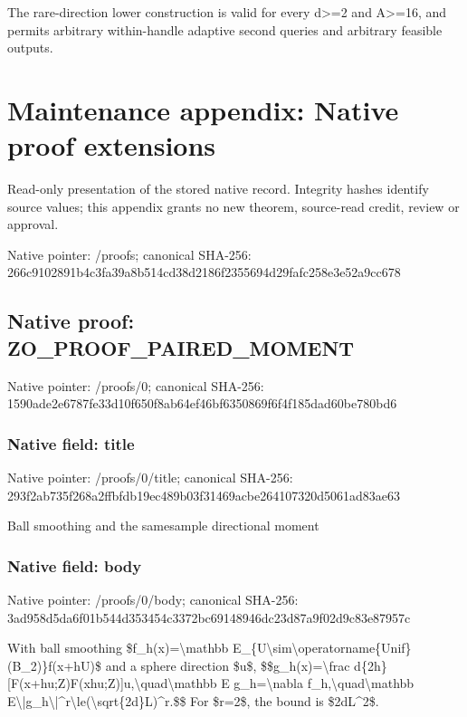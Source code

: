 \documentclass[10pt,a4paper]{article}
\begin{document}
The rare-direction lower construction is valid for every d>=2 and A>=16, and permits arbitrary within-handle adaptive second queries and arbitrary feasible outputs.



\section{Maintenance appendix: Native proof extensions}


Read-only presentation of the stored native record. Integrity hashes identify source values; this appendix grants no new theorem, source-read credit, review or approval.



Native pointer: /proofs; canonical SHA-256: 266c9102891b4c3fa39a8b51\allowbreak{}4cd38d2186f2355694d29faf\allowbreak{}c258e3e52a9cc678



\subsection{Native proof: ZO\_PROOF\_PAIRED\_MOMENT}


Native pointer: /proofs/0; canonical SHA-256: 1590ade2e6787fe33d10f650\allowbreak{}f8ab64ef46bf6350869f6f4f\allowbreak{}185dad60be780bd6



\subsubsection{Native field: title}


Native pointer: /proofs/0/title; canonical SHA-256: 293f2ab735f268a2ffbfdb19\allowbreak{}ec489b03f31469acbe264107\allowbreak{}320d5061ad83ae63


Ball smoothing and the samesample directional moment


\subsubsection{Native field: body}


Native pointer: /proofs/0/body; canonical SHA-256: 3ad958d5da6f01b544d35345\allowbreak{}4c3372bc69148946dc23d87a\allowbreak{}9f02d9c83e87957c


With ball smoothing \$f\_h(x)=\textbackslash{}mathbb E\_\{U\textbackslash{}sim\textbackslash{}operatorname\{Un\allowbreak{}if\}(B\_2)\}f(x+hU)\$ and a sphere direction \$u\$,
\$\$g\_h(x)=\textbackslash{}frac d\{2h\}[F(x+hu;Z)F(xhu;Z\allowbreak{})]u,\textbackslash{}quad\textbackslash{}mathbb E g\_h=\textbackslash{}nabla f\_h,\textbackslash{}quad\textbackslash{}mathbb E\textbackslash{}|g\_h\textbackslash{}|\textasciicircum{}r\textbackslash{}le(\textbackslash{}sqrt\{2d\}L)\textasciicircum{}r.\$\$
For \$r=2\$, the bound is \$2dL\textasciicircum{}2\$.
\end{document}
